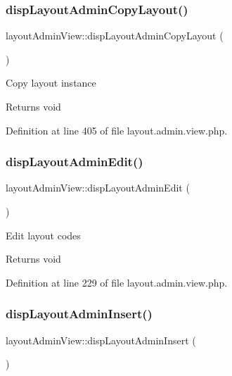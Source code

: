 \subsubsection{\texorpdfstring{disp\+Layout\+Admin\+Copy\+Layout()}{dispLayoutAdminCopyLayout()}}
{\footnotesize\ttfamily layout\+Admin\+View\+::disp\+Layout\+Admin\+Copy\+Layout (\begin{DoxyParamCaption}{ }\end{DoxyParamCaption})}

Copy layout instance \begin{DoxyReturn}{Returns}
void 
\end{DoxyReturn}


Definition at line 405 of file layout.\+admin.\+view.\+php.

\mbox{\label{classlayoutAdminView_a21250397a3190ca81f64d8ad9af3fff8}} 
\subsubsection{\texorpdfstring{disp\+Layout\+Admin\+Edit()}{dispLayoutAdminEdit()}}
{\footnotesize\ttfamily layout\+Admin\+View\+::disp\+Layout\+Admin\+Edit (\begin{DoxyParamCaption}{ }\end{DoxyParamCaption})}

Edit layout codes \begin{DoxyReturn}{Returns}
void 
\end{DoxyReturn}


Definition at line 229 of file layout.\+admin.\+view.\+php.

\mbox{\label{classlayoutAdminView_a8b9a9218b2de78d6a0578471852310b0}} 
\subsubsection{\texorpdfstring{disp\+Layout\+Admin\+Insert()}{dispLayoutAdminInsert()}}
{\footnotesize\ttfamily layout\+Admin\+View\+::disp\+Layout\+Admin\+Insert (\begin{DoxyParamCaption}{ }\end{DoxyParamCaption})}

